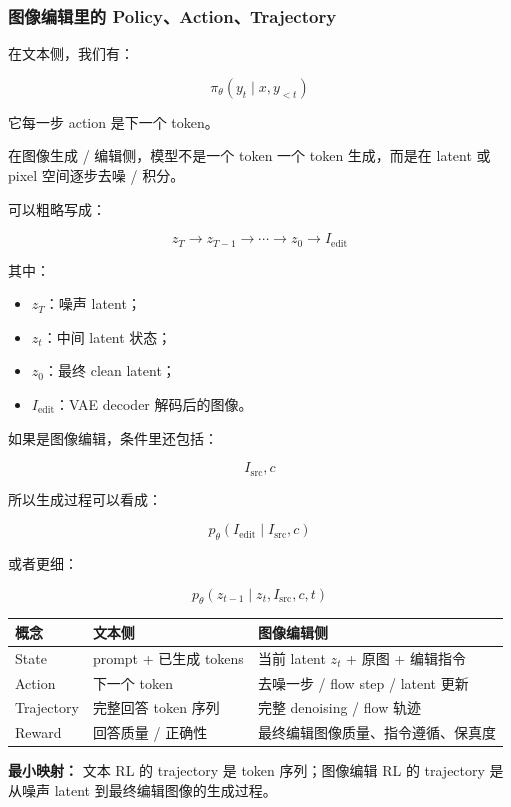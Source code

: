 \subsubsection{图像编辑里的 Policy、Action、Trajectory}

在文本侧，我们有：

\[
\pi_\theta(y_t\mid x,y_{<t})
\]

它每一步 action 是下一个 token。

在图像生成 / 编辑侧，模型不是一个 token 一个 token 生成，而是在 latent 或 pixel 空间逐步去噪 / 积分。

可以粗略写成：

\[
z_T
\to
z_{T-1}
\to
\cdots
\to
z_0
\to
I_\text{edit}
\]

其中：

\begin{itemize}[leftmargin=1.5em]
  \item $z_T$：噪声 latent；
  \item $z_t$：中间 latent 状态；
  \item $z_0$：最终 clean latent；
  \item $I_\text{edit}$：VAE decoder 解码后的图像。
\end{itemize}

如果是图像编辑，条件里还包括：

\[
I_\text{src}, c
\]

所以生成过程可以看成：

\[
p_\theta(I_\text{edit}\mid I_\text{src}, c)
\]

或者更细：

\[
p_\theta(z_{t-1}\mid z_t, I_\text{src}, c, t)
\]

\begin{center}
{\small
\begin{tabular}{p{3cm}p{4.8cm}p{4.8cm}}
\hline
\textbf{概念} & \textbf{文本侧} & \textbf{图像编辑侧} \\
\hline
State
&
prompt + 已生成 tokens
&
当前 latent $z_t$ + 原图 + 编辑指令
\\
Action
&
下一个 token
&
去噪一步 / flow step / latent 更新
\\
Trajectory
&
完整回答 token 序列
&
完整 denoising / flow 轨迹
\\
Reward
&
回答质量 / 正确性
&
最终编辑图像质量、指令遵循、保真度
\\
\hline
\end{tabular}
}
\end{center}

\begin{summarybox}
\textbf{最小映射：} 文本 RL 的 trajectory 是 token 序列；图像编辑 RL 的 trajectory 是从噪声 latent 到最终编辑图像的生成过程。
\end{summarybox}

